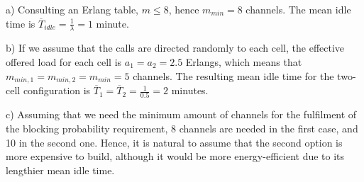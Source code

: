 a)
Consulting an Erlang table, $m \leq 8$, hence $m_{min} = 8$ channels. The mean
idle time is $\overline{T}_{idle} = \frac{1}{\lambda} = 1$ minute.

b)
If we assume that the calls are directed randomly to each cell, the effective
offered load for each cell is $a_1 = a_2 = 2.5$ Erlangs, which means that
$m_{min,1} = m_{min,2} = m_{min} = 5$ channels. The resulting mean idle time for
the two-cell configuration is
$\overline{T}_1 = \overline{T}_2 = \frac{1}{0.5} = 2$ minutes.

c)
Assuming that we need the minimum amount of channels for the fulfilment of the
blocking probability requirement, 8 channels are needed in the first case, and
10 in the second one. Hence, it is natural to assume that the second option is
more expensive to build, although it would be more energy-efficient due to its
lengthier mean idle time.
